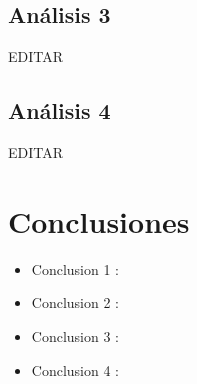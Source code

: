 \documentclass[preprint,12pt]{elsarticle}
\begin{document}
\subsection{\textbf{Análisis 3}}
EDITAR\\

\subsection{\textbf{Análisis 4}}
EDITAR\\




\section{Conclusiones}

\begin{itemize}

\item Conclusion 1 : \\

\item Conclusion 2 : \\ 

\item Conclusion 3 : \\ 

\item Conclusion 4 : \\ 
\end{itemize}


	
	\newpage
	
		 
	
	
\end{document}
